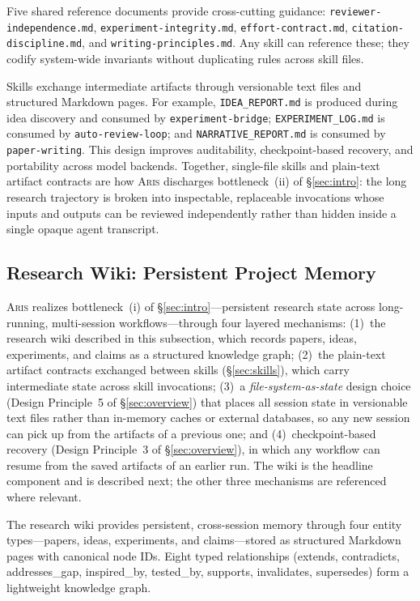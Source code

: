 \documentclass{article}
\newcommand{\aris}{\textsc{Aris}}
\theoremstyle{remark}
\begin{document}
Five shared reference documents provide cross-cutting guidance: \texttt{reviewer-independence.md}, \texttt{experiment-integrity.md}, \texttt{effort-contract.md}, \texttt{citation-discipline.md}, and \texttt{writing-principles.md}.
Any skill can reference these; they codify system-wide invariants without duplicating rules across skill files.

Skills exchange intermediate artifacts through versionable text files and structured Markdown pages.
For example, \texttt{IDEA\_REPORT.md} is produced during idea discovery and consumed by \texttt{experiment-bridge}; \texttt{EXPERIMENT\_LOG.md} is consumed by \texttt{auto-review-loop}; and \texttt{NARRATIVE\_REPORT.md} is consumed by \texttt{paper-writing}.
This design improves auditability, checkpoint-based recovery, and portability across model backends.
Together, single-file skills and plain-text artifact contracts are how \aris{} discharges bottleneck~(ii) of \S\ref{sec:intro}: the long research trajectory is broken into inspectable, replaceable invocations whose inputs and outputs can be reviewed independently rather than hidden inside a single opaque agent transcript.

\subsection{Research Wiki: Persistent Project Memory}
\label{sec:wiki}

\aris{} realizes bottleneck~(i) of \S\ref{sec:intro}---persistent research state across long-running, multi-session workflows---through four layered mechanisms: (1)~the research wiki described in this subsection, which records papers, ideas, experiments, and claims as a structured knowledge graph; (2)~the plain-text artifact contracts exchanged between skills (\S\ref{sec:skills}), which carry intermediate state across skill invocations; (3)~a \emph{file-system-as-state} design choice (Design Principle~5 of \S\ref{sec:overview}) that places all session state in versionable text files rather than in-memory caches or external databases, so any new session can pick up from the artifacts of a previous one; and (4)~checkpoint-based recovery (Design Principle~3 of \S\ref{sec:overview}), in which any workflow can resume from the saved artifacts of an earlier run.
The wiki is the headline component and is described next; the other three mechanisms are referenced where relevant.

The research wiki provides persistent, cross-session memory through four entity types---papers, ideas, experiments, and claims---stored as structured Markdown pages with canonical node IDs.
Eight typed relationships (extends, contradicts, addresses\_gap, inspired\_by, tested\_by, supports, invalidates, supersedes) form a lightweight knowledge graph.
\end{document}
